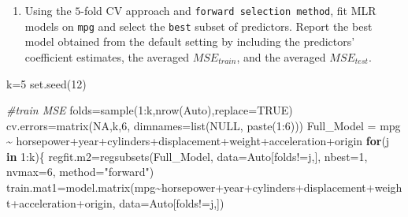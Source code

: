 \documentclass[
]{article}
\newenvironment{Shaded}{\begin{snugshade}}{\end{snugshade}}
\newcommand{\AttributeTok}[1]{\textcolor[rgb]{0.77,0.63,0.00}{#1}}
\newcommand{\CommentTok}[1]{\textcolor[rgb]{0.56,0.35,0.01}{\textit{#1}}}
\newcommand{\ConstantTok}[1]{\textcolor[rgb]{0.00,0.00,0.00}{#1}}
\newcommand{\ControlFlowTok}[1]{\textcolor[rgb]{0.13,0.29,0.53}{\textbf{#1}}}
\newcommand{\DecValTok}[1]{\textcolor[rgb]{0.00,0.00,0.81}{#1}}
\newcommand{\FunctionTok}[1]{\textcolor[rgb]{0.00,0.00,0.00}{#1}}
\newcommand{\NormalTok}[1]{#1}
\newcommand{\OtherTok}[1]{\textcolor[rgb]{0.56,0.35,0.01}{#1}}
\newcommand{\SpecialCharTok}[1]{\textcolor[rgb]{0.00,0.00,0.00}{#1}}
\newcommand{\StringTok}[1]{\textcolor[rgb]{0.31,0.60,0.02}{#1}}
\providecommand{\tightlist}{%
  \setlength{\itemsep}{0pt}\setlength{\parskip}{0pt}}
\begin{document}
\begin{enumerate}
\def\labelenumi{\alph{enumi}.}
\setcounter{enumi}{1}
\tightlist
\item
  Using the \(5\)-fold CV approach and
  \texttt{forward\ selection\ method}, fit MLR models on \texttt{mpg}
  and select the \texttt{best} subset of predictors. Report the best
  model obtained from the default setting by including the predictors'
  coefficient estimates, the averaged \(MSE_{train}\), and the averaged
  \(MSE_{test}\).
\end{enumerate}

\begin{Shaded}
\begin{Highlighting}[]
\NormalTok{k}\OtherTok{=}\DecValTok{5}
\FunctionTok{set.seed}\NormalTok{(}\DecValTok{12}\NormalTok{)}

\CommentTok{\#train MSE}
\NormalTok{folds}\OtherTok{=}\FunctionTok{sample}\NormalTok{(}\DecValTok{1}\SpecialCharTok{:}\NormalTok{k,}\FunctionTok{nrow}\NormalTok{(Auto),}\AttributeTok{replace=}\ConstantTok{TRUE}\NormalTok{)}
\NormalTok{cv.errors}\OtherTok{=}\FunctionTok{matrix}\NormalTok{(}\ConstantTok{NA}\NormalTok{,k,}\DecValTok{6}\NormalTok{, }\AttributeTok{dimnames=}\FunctionTok{list}\NormalTok{(}\ConstantTok{NULL}\NormalTok{, }\FunctionTok{paste}\NormalTok{(}\DecValTok{1}\SpecialCharTok{:}\DecValTok{6}\NormalTok{)))}
\NormalTok{Full\_Model }\OtherTok{=}\NormalTok{ mpg }\SpecialCharTok{\textasciitilde{}}\NormalTok{ horsepower}\SpecialCharTok{+}\NormalTok{year}\SpecialCharTok{+}\NormalTok{cylinders}\SpecialCharTok{+}\NormalTok{displacement}\SpecialCharTok{+}\NormalTok{weight}\SpecialCharTok{+}\NormalTok{acceleration}\SpecialCharTok{+}\NormalTok{origin}
\ControlFlowTok{for}\NormalTok{(j }\ControlFlowTok{in} \DecValTok{1}\SpecialCharTok{:}\NormalTok{k)\{}
\NormalTok{  regfit.m2}\OtherTok{=}\FunctionTok{regsubsets}\NormalTok{(Full\_Model, }\AttributeTok{data=}\NormalTok{Auto[folds}\SpecialCharTok{!=}\NormalTok{j,], }\AttributeTok{nbest=}\DecValTok{1}\NormalTok{, }
                     \AttributeTok{nvmax=}\DecValTok{6}\NormalTok{, }\AttributeTok{method=}\StringTok{"forward"}\NormalTok{)}
\NormalTok{  train.mat1}\OtherTok{=}\FunctionTok{model.matrix}\NormalTok{(mpg}\SpecialCharTok{\textasciitilde{}}\NormalTok{horsepower}\SpecialCharTok{+}\NormalTok{year}\SpecialCharTok{+}\NormalTok{cylinders}\SpecialCharTok{+}\NormalTok{displacement}\SpecialCharTok{+}\NormalTok{weight}\SpecialCharTok{+}\NormalTok{acceleration}\SpecialCharTok{+}\NormalTok{origin, }\AttributeTok{data=}\NormalTok{Auto[folds}\SpecialCharTok{!=}\NormalTok{j,])}

\end{Highlighting}
\end{Shaded}
\end{document}
